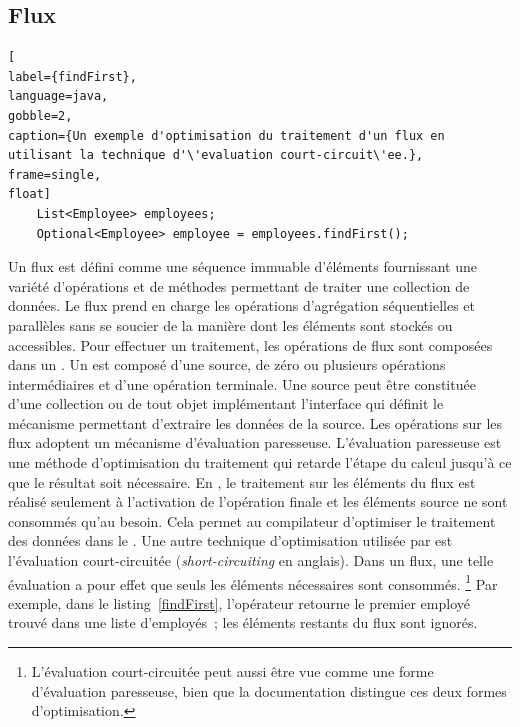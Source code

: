 \subsection{Flux}


\begin{lstlisting}[
label={findFirst},
language=java,
gobble=2,
caption={Un exemple d'optimisation du traitement d'un flux en utilisant la technique d'\'evaluation court-circuit\'ee.},
frame=single,
float]
	List<Employee> employees;
	Optional<Employee> employee = employees.findFirst();
\end{lstlisting}


Un flux est d\'efini comme une s\'equence immuable d'\'el\'ements fournissant une vari\'et\'e d'op\'erations et de m\'ethodes permettant de traiter une collection de donn\'ees. Le flux prend en charge les op\'erations d'agr\'egation \citep{javaStreamAggregate} s\'equentielles et parall\`eles sans se soucier de la mani\`ere dont les \'el\'ements sont stock\'es ou accessibles. Pour effectuer un traitement, les op\'erations de flux sont compos\'ees dans un . Un  est compos\'e d'une source, de z\'ero ou plusieurs op\'erations interm\'ediaires et d'une op\'eration terminale. Une source peut \^etre constitu\'ee d'une collection ou de tout objet impl\'ementant l'interface qui d\'efinit le m\'ecanisme permettant d'extraire les donn\'ees de la source. 
Les op\'erations sur les flux adoptent un m\'ecanisme d'\'evaluation paresseuse. L'\'evaluation paresseuse est une m\'ethode d'optimisation du traitement qui retarde l'\'etape du calcul jusqu'\`a ce que le r\'esultat soit nécessaire. En , le traitement sur les \'el\'ements du flux est r\'ealis\'e seulement \`a l'activation de l'op\'eration finale et les \'el\'ements source ne sont consomm\'es qu'au besoin. Cela permet au compilateur d'optimiser le traitement des donn\'ees dans le .
Une autre technique d'optimisation utilis\'ee par  est l'\'evaluation court-circuit\'ee (\emph{short-circuiting} en anglais). Dans un flux, une telle \'evaluation a pour effet que seuls les \'el\'ements n\'ecessaires sont consomm\'es.%
%
\footnote{L'\'evaluation court-circuit\'ee peut aussi \^etre vue comme une forme d'\'evaluation paresseuse, bien que la documentation  distingue ces deux formes d'optimisation.}
%
Par exemple, dans le listing~\ref{findFirst}, l'opérateur  retourne le premier employ\'e trouv\'e dans une liste d'employ\'es~; les \'el\'ements restants du flux sont ignor\'es.


